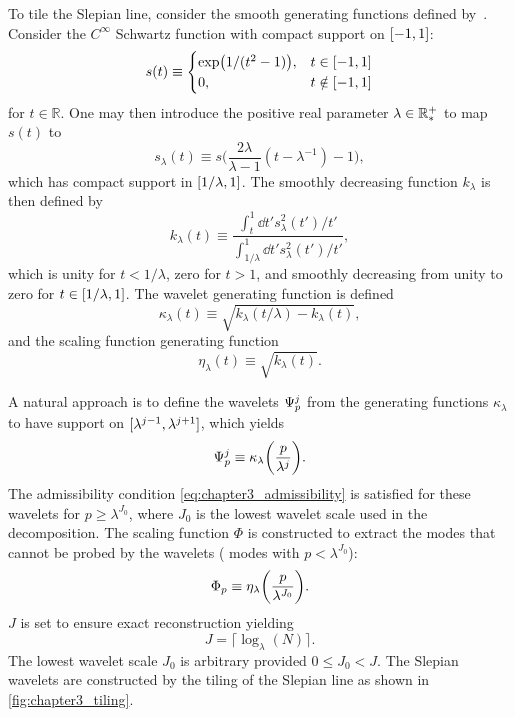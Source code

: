 To tile the Slepian line, consider the smooth generating functions defined by~\cite{Wiaux2008}.
Consider the \(C^{\infty}\) Schwartz function with compact support on \(\interval{-1}{1}\):
%
\begin{equation}
	s(t) \equiv
	\begin{cases}
		\exp(1/(t^{2}-1)), & t \in \interval{-1}{1}    \\
		0,                 & t \notin \interval{-1}{1}
	\end{cases}
\end{equation}
%
for \(t \in \mathbb{R}\).
One may then introduce the positive real parameter \(\lambda \in \mathbb{R}_{\ast}^{+}{}\) to map \(s(t)\) to
%
\begin{equation}
	s_{\lambda}(t)
	\equiv s\bigg(\frac{2\lambda}{\lambda-1}(t-\lambda^{-1}) - 1\bigg),
\end{equation}
%
which has compact support in \(\interval{1/\lambda}{1}\).
The smoothly decreasing function \(k_{\lambda}\) is then defined by
%
\begin{equation}
	k_{\lambda}(t)
	\equiv \frac{\int_{t}^{1} \dd{t'} s^{2}_{\lambda}(t')/t'}
	{\int_{1/\lambda}^{1} \dd{t'} s^{2}_{\lambda}(t')/t'},
\end{equation}
%
which is unity for \(t < 1/\lambda{}\), zero for \(t > 1\), and smoothly decreasing from unity to zero for \(t \in \interval{1/\lambda}{1}\).
The wavelet generating function is defined
%
\begin{equation}
	\kappa_{\lambda}(t)
	\equiv \sqrt{k_{\lambda}(t/\lambda) - k_{\lambda}(t)},
\end{equation}
%
and the scaling function generating function
%
\begin{equation}
	\eta_{\lambda}(t)
	\equiv \sqrt{k_{\lambda}(t)}.
\end{equation}

A natural approach is to define the wavelets \({\Psi}_{p}^{j}\) from the generating functions \(\kappa_{\lambda}\) to have support on \(\interval{\lambda^{j-1}}{\lambda^{j+1}}\), which yields
%
\begin{equation}
	{\Psi}_{p}^{j}
	\equiv \kappa_{\lambda}\bigg(\frac{p}{\lambda^{j}}\bigg).
\end{equation}
%
The admissibility condition \cref{eq:chapter3_admissibility} is satisfied for these wavelets for \(p \geq \lambda^{J_{0}}\), where \(J_{0}\) is the lowest wavelet scale used in the decomposition.
The scaling function \(\Phi{}\) is constructed to extract the modes that cannot be probed by the wavelets (\ie{} modes with \(p < \lambda^{J_{0}}\)):
%
\begin{equation}
	{\Phi}_{p}
	\equiv \eta_{\lambda}\bigg(\frac{p}{\lambda^{J_{0}}}\bigg).
\end{equation}
%
\(J\) is set to ensure exact reconstruction yielding
%
\begin{equation}
	J = \lceil{} \log_{\lambda}(N)\rceil{}.
\end{equation}
%
The lowest wavelet scale \(J_{0}\) is arbitrary provided \(0 \leq J_{0} < J\).
The Slepian wavelets are constructed by the tiling of the Slepian line as shown in \cref{fig:chapter3_tiling}.

